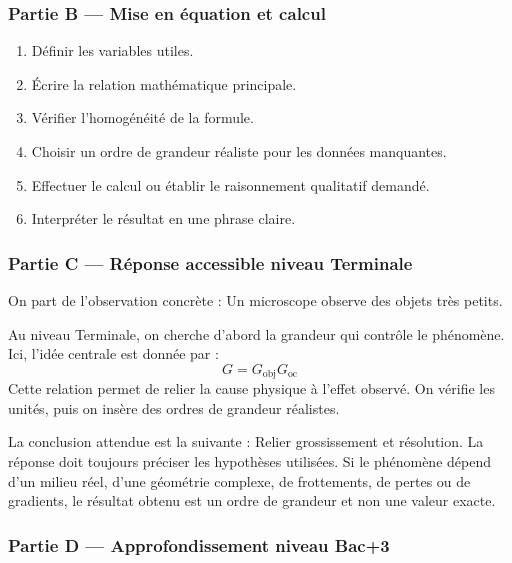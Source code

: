 \documentclass[11pt,a4paper]{article}
\begin{document}
\subsubsection*{Partie B — Mise en équation et calcul}

\begin{enumerate}
  \item Définir les variables utiles.
  \item Écrire la relation mathématique principale.
  \item Vérifier l'homogénéité de la formule.
  \item Choisir un ordre de grandeur réaliste pour les données manquantes.
  \item Effectuer le calcul ou établir le raisonnement qualitatif demandé.
  \item Interpréter le résultat en une phrase claire.
\end{enumerate}

\subsubsection*{Partie C — Réponse accessible niveau Terminale}

\begin{corrigebox}
On part de l'observation concrète : Un microscope observe des objets très petits.

Au niveau Terminale, on cherche d'abord la grandeur qui contrôle le phénomène. Ici, l'idée centrale est donnée par :
\[
G=G_{\mathrm{obj}}G_{\mathrm{oc}}
\]
Cette relation permet de relier la cause physique à l'effet observé. On vérifie les unités, puis on insère des ordres de grandeur réalistes.

La conclusion attendue est la suivante : Relier grossissement et résolution. La réponse doit toujours préciser les hypothèses utilisées. Si le phénomène dépend d'un milieu réel, d'une géométrie complexe, de frottements, de pertes ou de gradients, le résultat obtenu est un ordre de grandeur et non une valeur exacte.
\end{corrigebox}

\subsubsection*{Partie D — Approfondissement niveau Bac+3}
\end{document}
